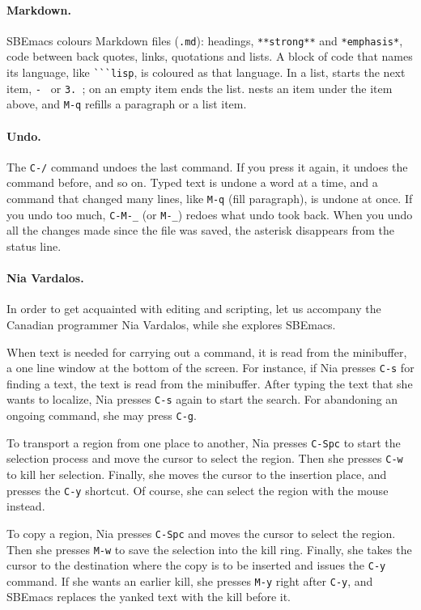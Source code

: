 \documentclass[a4paper,12pt,openany]{book}
\begin{document}
\paragraph{Markdown.} SBEmacs colours Markdown files (\verb|.md|):
headings, \verb|**strong**| and \verb|*emphasis*|, code between back
quotes, links, quotations and lists. A block of code that names its language,
like \verb|```lisp|, is coloured as that language. In a list,
 starts the next item, \verb|- | or \verb|3. |;
 on an empty item ends the list.  nests an item under
the item above, and \verb|M-q| refills a paragraph or a list item.

\paragraph{Undo.} The \verb|C-/| command undoes the last
command. If you press it again, it undoes the command before,
and so on. Typed text is undone a word at a time, and a command
that changed many lines, like \verb|M-q| (fill paragraph), is undone
at once. If you undo too much, \verb|C-M-_| (or \verb|M-_|) redoes
what undo took back. When you undo all the changes made since the
file was saved, the asterisk disappears from the status line.

\paragraph{Nia Vardalos.}
In order to get acquainted with editing and scripting,
let us accompany the Canadian programmer Nia
Vardalos, while she explores SBEmacs.

When text is needed for carrying out a command,
it is read from the minibuffer, a one line
window at the bottom of the screen. For instance,
if Nia presses \verb|C-s| for finding a text,
the text is read from the minibuffer. After
typing the text that she wants to localize,
Nia presses \verb|C-s| again to start the search.
For abandoning an ongoing command, she may press \verb|C-g|.

To transport a region from one place to another,
Nia presses \verb|C-Spc| to start
 the selection process
 and move the cursor to select the region.
 Then she presses \verb|C-w| to
kill her selection. Finally, she moves
the cursor to the insertion place,
and presses the \verb|C-y| shortcut.
Of course, she can select the region with the mouse instead.

To copy a region, Nia presses \verb|C-Spc| and moves the cursor to select the region.
Then she presses \verb|M-w| to save the selection into the kill ring. Finally,
she takes the cursor to the destination where the copy is to be inserted and
issues the \verb|C-y| command. If she wants an earlier kill,
she presses \verb|M-y| right after \verb|C-y|, and SBEmacs replaces
the yanked text with the kill before it.
\end{document}
